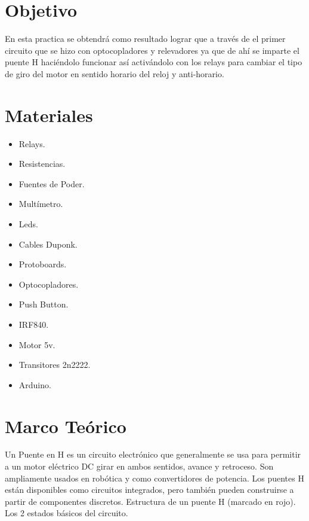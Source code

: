 \documentclass[10pt,a4paper]{article}
\begin{document}
\newpage

\section{Objetivo}
En esta practica se obtendrá como resultado lograr que a través de el primer circuito que se hizo con optocopladores y relevadores ya que de ahí se imparte el puente H haciéndolo funcionar así activándolo con los relays para cambiar el tipo de giro del motor en sentido horario del reloj y anti-horario.

\section{Materiales}

\begin{itemize}

\item Relays.
\item Resistencias.
\item Fuentes de Poder.
\item Multímetro.
\item Leds.
\item Cables Duponk.
\item Protoboards.
\item Optocopladores.
\item Push Button.
\item IRF840.
\item Motor 5v.
\item Transitores 2n2222.
\item Arduino.


\end{itemize}

\section{Marco Teórico}

Un Puente en H es un circuito electrónico que generalmente se usa para permitir a un motor eléctrico DC girar en ambos sentidos, avance y retroceso. Son ampliamente usados en robótica y como convertidores de potencia. Los puentes H están disponibles como circuitos integrados, pero también pueden construirse a partir de componentes discretos.
Estructura de un puente H (marcado en rojo).
Los 2 estados básicos del circuito.
\end{document}

